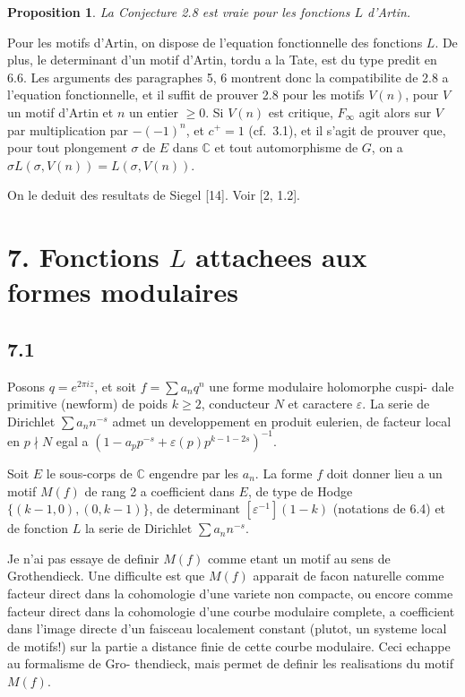 \documentclass[12pt,a4paper]{article}
\theoremstyle{plain}
\newtheorem{proposition}[theorem]{Proposition}
\theoremstyle{definition}
\theoremstyle{remark}
\newcommand{\C}{\mathbb{C}}
\begin{document}
\begin{proposition}\label{prop:6.7}
La Conjecture 2.8 est vraie pour les fonctions $L$ d'Artin.
\end{proposition}

Pour les motifs d'Artin, on dispose de l'equation fonctionnelle des fonctions $L$.
De plus, le determinant d'un motif d'Artin, tordu a la Tate, est du type predit en
6.6. Les arguments des paragraphes 5, 6 montrent donc la compatibilite de 2.8 a
l'equation fonctionnelle, et il suffit de prouver 2.8 pour les motifs $V(n)$, pour $V$ un
motif d'Artin et $n$ un entier $\geq 0$. Si $V(n)$ est critique, $F_\infty$ agit alors sur $V$ par
multiplication par $-(-1)^n$, et $c^+ = 1$ (cf.~3.1), et il s'agit de prouver que, pour
tout plongement $\sigma$ de $E$ dans $\C$ et tout automorphisme de $G$, on a
$\sigma L(\sigma, V(n)) = L(\sigma, V(n))$.

On le deduit des resultats de Siegel [14]. Voir [2, 1.2].


\section*{7. Fonctions $L$ attachees aux formes modulaires}

\subsection*{7.1}

Posons $q = e^{2\pi i z}$, et soit $f = \sum a_n q^n$ une forme modulaire holomorphe cuspi-
dale primitive (newform) de poids $k \geq 2$, conducteur $N$ et caractere $\varepsilon$. La serie de
Dirichlet $\sum a_n n^{-s}$ admet un developpement en produit eulerien, de facteur local
en $p \nmid N$ egal a $(1 - a_p p^{-s} + \varepsilon(p) p^{k-1-2s})^{-1}$.

Soit $E$ le sous-corps de $\C$ engendre par les $a_n$. La forme $f$ doit donner lieu a un
motif $M(f)$ de rang 2 a coefficient dans $E$, de type de Hodge $\{(k-1,0), (0,k-1)\}$,
de determinant $[\varepsilon^{-1}](1-k)$ (notations de 6.4) et de fonction $L$ la serie de Dirichlet
$\sum a_n n^{-s}$.

Je n'ai pas essaye de definir $M(f)$ comme etant un motif au sens de Grothendieck.
Une difficulte est que $M(f)$ apparait de facon naturelle comme facteur direct dans
la cohomologie d'une variete non compacte, ou encore comme facteur direct dans
la cohomologie d'une courbe modulaire complete, a coefficient dans l'image directe
d'un faisceau localement constant (plutot, un systeme local de motifs!) sur la partie
a distance finie de cette courbe modulaire. Ceci echappe au formalisme de Gro-
thendieck, mais permet de definir les realisations du motif $M(f)$.
\end{document}
